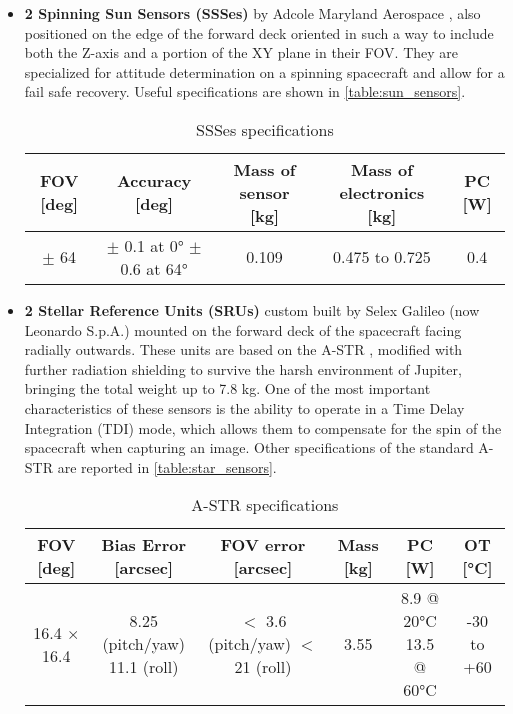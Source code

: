 \begin{itemize}
    \item \textbf{2 Spinning Sun Sensors (SSSes)} by Adcole Maryland Aerospace \cite{SSS}, also positioned on the edge of the forward deck oriented in such a way to include both the Z-axis and a portion of the XY plane in their FOV. They are specialized for attitude determination on a spinning spacecraft and allow for a fail safe recovery. Useful specifications are shown in \autoref{table:sun_sensors}.
    
    \begin{table}[H]
        \renewcommand{\arraystretch}{1.3}
        \centering
        \small
        \begin{tabular}{|c|c|c|c|c|}
            \hline
            \textbf{FOV [deg]} & \textbf{Accuracy [deg]} & \textbf{Mass of sensor [kg]} & \textbf{Mass of electronics [kg]} & \textbf{PC [W]}\\
            \hline
            \hline
            $\pm$ 64 & \makecell{$\pm$ 0.1 at 0° \\  $\pm$ 0.6 at 64°} & 0.109 & 0.475 to 0.725 & 0.4 \\
            \hline
        \end{tabular}
        \caption{SSSes specifications}
        \label{table:sun_sensors}
    \end{table}

    \item \textbf{2 Stellar Reference Units (SRUs)} custom built by Selex Galileo (now Leonardo S.p.A.) mounted on the forward deck of the spacecraft facing radially outwards. These units are based on the A-STR \cite{SRU}, modified with further radiation shielding to survive the harsh environment of Jupiter, bringing the total weight up to 7.8 kg. One of the most important characteristics of these sensors is the ability to operate in a Time Delay Integration (TDI) mode, which allows them to compensate for the spin of the spacecraft when capturing an image. Other specifications of the standard A-STR are reported in \autoref{table:star_sensors}.
    \begin{table}[H]
        \renewcommand{\arraystretch}{1.3}
        \centering
        \small
        \begin{tabular}{|c|c|c|c|c|c|}
            \hline
            \textbf{FOV [deg]} & \textbf{Bias Error [arcsec]} & \textbf{FOV error [arcsec]} & \textbf{Mass [kg]} & \textbf{PC [W]} & \textbf{OT [°C]} \\
            \hline
            \hline
            16.4 $\times$ 16.4 & \makecell{8.25 (pitch/yaw) \\ 11.1 (roll)} & \makecell{$<$ 3.6 (pitch/yaw) \\ $<$ 21 (roll)} &
            3.55 & \makecell{8.9 @ 20°C \\ 13.5 @ 60°C} & -30 to +60\\
            \hline
        \end{tabular}
        \caption{A-STR specifications}
        \label{table:star_sensors}
    \end{table}


\end{itemize}
